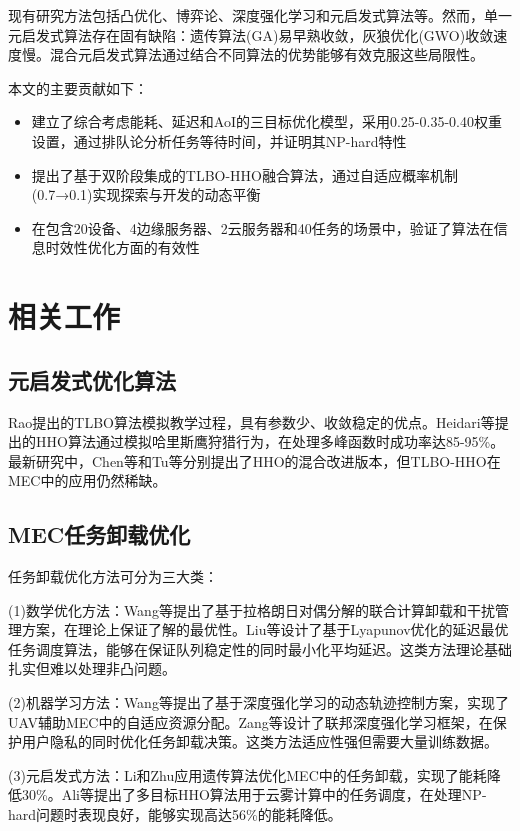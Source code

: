 \documentclass[conference]{IEEEtran}
\begin{document}
现有研究方法包括凸优化\cite{b2}、博弈论、深度强化学习\cite{b3}和元启发式算法等。然而，单一元启发式算法存在固有缺陷：遗传算法(GA)易早熟收敛，灰狼优化(GWO)收敛速度慢\cite{b4}。混合元启发式算法通过结合不同算法的优势能够有效克服这些局限性。

本文的主要贡献如下：
\begin{itemize}
    \item 建立了综合考虑能耗、延迟和AoI的三目标优化模型，采用0.25-0.35-0.40权重设置，通过排队论分析任务等待时间，并证明其NP-hard特性
    \item 提出了基于双阶段集成的TLBO-HHO融合算法，通过自适应概率机制(0.7→0.1)实现探索与开发的动态平衡
    \item 在包含20设备、4边缘服务器、2云服务器和40任务的场景中，验证了算法在信息时效性优化方面的有效性
\end{itemize}

\section{相关工作}
\subsection{元启发式优化算法}
Rao\cite{b5}提出的TLBO算法模拟教学过程，具有参数少、收敛稳定的优点。Heidari等\cite{b6}提出的HHO算法通过模拟哈里斯鹰狩猎行为，在处理多峰函数时成功率达85-95\%。最新研究中，Chen等\cite{b7}和Tu等\cite{b8}分别提出了HHO的混合改进版本，但TLBO-HHO在MEC中的应用仍然稀缺。


\subsection{MEC任务卸载优化}
任务卸载优化方法可分为三大类：

(1)数学优化方法：Wang等\cite{b9}提出了基于拉格朗日对偶分解的联合计算卸载和干扰管理方案，在理论上保证了解的最优性。Liu等\cite{b10}设计了基于Lyapunov优化的延迟最优任务调度算法，能够在保证队列稳定性的同时最小化平均延迟。这类方法理论基础扎实但难以处理非凸问题。

(2)机器学习方法：Wang等\cite{b11}提出了基于深度强化学习的动态轨迹控制方案，实现了UAV辅助MEC中的自适应资源分配。Zang等\cite{b13}设计了联邦深度强化学习框架，在保护用户隐私的同时优化任务卸载决策。这类方法适应性强但需要大量训练数据。

(3)元启发式方法：Li和Zhu\cite{b12}应用遗传算法优化MEC中的任务卸载，实现了能耗降低30\%。Ali等\cite{b14}提出了多目标HHO算法用于云雾计算中的任务调度，在处理NP-hard问题时表现良好，能够实现高达56\%的能耗降低。
\end{document}
